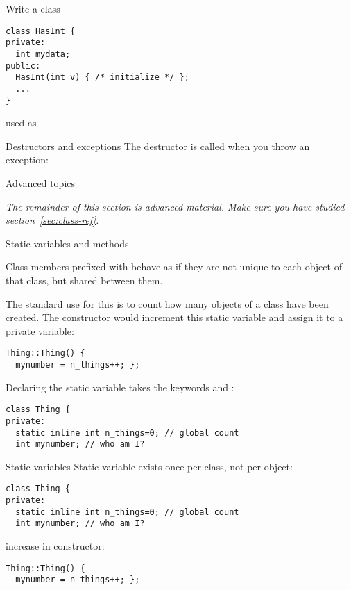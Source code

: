 \begin{exercise}
  \label{ex:destruct-trace}
  Write a class
\begin{lstlisting}
class HasInt {
private:
  int mydata;
public:
  HasInt(int v) { /* initialize */ };
  ...
}
\end{lstlisting}
used as
%
\end{exercise}

\begin{block}{Destructors and exceptions}
  \label{sl:exceptobj}
  The destructor is called when you throw an exception:
\end{block}

 {Advanced topics}

\emph{The remainder of this section is advanced material. Make sure
  you have studied section~\ref{sec:class-ref}.}

 {Static variables and methods}
\label{sec:class-static}

Class members prefixed with  behave as if
they are not unique to each object of that class,
but shared between them.

The standard use for this is to count how many objects
of a class have been created.
The constructor would increment this static variable
and assign it to a private variable:
\begin{lstlisting}
Thing::Thing() {
  mynumber = n_things++; };
\end{lstlisting}

Declaring the static variable takes the keywords
 and :
\begin{lstlisting}
class Thing {
private:
  static inline int n_things=0; // global count
  int mynumber; // who am I?
\end{lstlisting}

\begin{slide}{Static variables}
  \label{sl:static-var}
Static variable exists once per class, not per object:
\begin{lstlisting}
class Thing {
private:
  static inline int n_things=0; // global count
  int mynumber; // who am I?
\end{lstlisting}
increase in constructor:
\begin{lstlisting}
Thing::Thing() {
  mynumber = n_things++; };
\end{lstlisting}
\end{slide}

